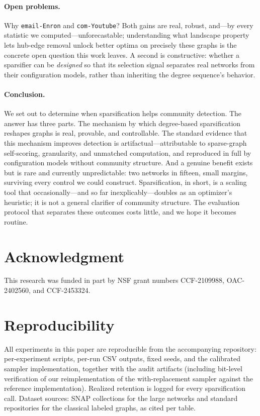 \paragraph{Open problems.}
Why \texttt{email-Enron} and \texttt{com-Youtube}?
Both gains are real, robust, and---by every statistic we computed---unforecastable; understanding what landscape property lets hub-edge removal unlock better optima on precisely these graphs is the concrete open question this work leaves.
A second is constructive: whether a sparsifier can be \emph{designed} so that its selection signal separates real networks from their configuration models, rather than inheriting the degree sequence's behavior.

\paragraph{Conclusion.}
We set out to determine when sparsification helps community detection.
The answer has three parts.
The mechanism by which degree-based sparsification reshapes graphs is real, provable, and controllable.
The standard evidence that this mechanism improves detection is artifactual---attributable to sparse-graph self-scoring, granularity, and unmatched computation, and reproduced in full by configuration models without community structure.
And a genuine benefit exists but is rare and currently unpredictable: two networks in fifteen, small margins, surviving every control we could construct.
Sparsification, in short, is a scaling tool that occasionally---and so far inexplicably---doubles as an optimizer's heuristic; it is not a general clarifier of community structure.
The evaluation protocol that separates these outcomes costs little, and we hope it becomes routine.

\section*{Acknowledgment}

This research was funded in part by NSF grant numbers CCF-2109988, OAC-2402560, and CCF-2453324.

\appendix

\section*{Reproducibility}
All experiments in this paper are reproducible from the accompanying repository: per-experiment scripts, per-run CSV outputs, fixed seeds, and the calibrated sampler implementation, together with the audit artifacts (including bit-level verification of our reimplementation of the with-replacement sampler against the reference implementation).
Realized retention is logged for every sparsification call.
Dataset sources: SNAP collections for the large networks and standard repositories for the classical labeled graphs, as cited per table.
